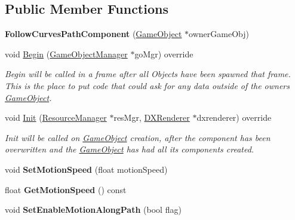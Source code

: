 \subsection*{Public Member Functions}
\begin{DoxyCompactItemize}
\item 
\mbox{\label{classFollowCurvesPathComponent_a0a8305b97943ca46e8d98e18a2482d07}} 
{\bfseries Follow\+Curves\+Path\+Component} (\hyperlink{classGameObject}{Game\+Object} $\ast$owner\+Game\+Obj)
\item 
void \hyperlink{classFollowCurvesPathComponent_aa66f258486a50ebc5bbbc0cf83c18d9f}{Begin} (\hyperlink{classGameObjectManager}{Game\+Object\+Manager} $\ast$go\+Mgr) override
\begin{DoxyCompactList}\small\item\em Begin will be called in a frame after all Objects have been spawned that frame. This is the place to put code that could ask for any data outside of the owner\textquotesingle{}s \hyperlink{classGameObject}{Game\+Object}. \end{DoxyCompactList}\item 
void \hyperlink{classFollowCurvesPathComponent_aec67ef723e9aae80f28e76800d93f87c}{Init} (\hyperlink{classResourceManager}{Resource\+Manager} $\ast$res\+Mgr, \hyperlink{classDXRenderer}{D\+X\+Renderer} $\ast$dxrenderer) override
\begin{DoxyCompactList}\small\item\em Init will be called on \hyperlink{classGameObject}{Game\+Object} creation, after the component has been overwritten and the \hyperlink{classGameObject}{Game\+Object} has had all its components created. \end{DoxyCompactList}\item 
\mbox{\label{classFollowCurvesPathComponent_a865b08196002ca81a53b670e4c11a464}} 
void {\bfseries Set\+Motion\+Speed} (float motion\+Speed)
\item 
\mbox{\label{classFollowCurvesPathComponent_afae7f49e923f7576f0aab9b17d45f165}} 
float {\bfseries Get\+Motion\+Speed} () const
\item 
\mbox{\label{classFollowCurvesPathComponent_a3bcecb9a1953a6e5f1b5563c26bb42a5}} 
void {\bfseries Set\+Enable\+Motion\+Along\+Path} (bool flag)

\end{DoxyCompactItemize}
